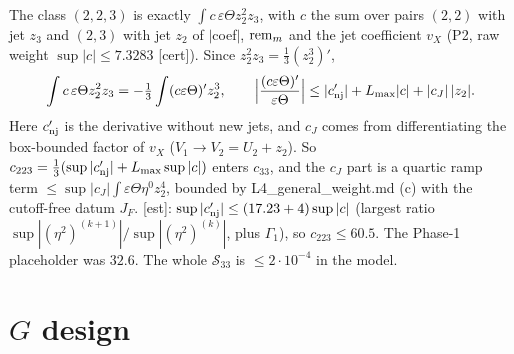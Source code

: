 \documentclass[11pt]{article}
\theoremstyle{remark}\newtheorem{remark}[theorem]{Remark}
\newcommand{\tC}{\textup{[cert]}}\newcommand{\tE}{\textup{[est]}}\newcommand{\tP}{\textup{[paper]}}\newcommand{\tR}{\textup{[rev]}}
\begin{document}
\begin{lemma}\label{lem:C}
The class $(2,2,3)$ is exactly $\int c\,\varepsilon\Theta z_2^2z_3$, with $c$ the sum over pairs $(2,2)$ with jet $z_3$ and $(2,3)$ with jet $z_2$ of $|$coef$|$, ${\rm rem}_m$ and the jet coefficient $v_X$ (P2, raw weight $\sup|c|\le7.3283$ \tC). Since $z_2^2z_3=\frac13(z_2^3)'$,
\[
\int c\,\varepsilon\Theta z_2^2z_3=-\tfrac13\int(c\varepsilon\Theta)'z_2^3,\qquad\Bigl|\frac{(c\varepsilon\Theta)'}{\varepsilon\Theta}\Bigr|\le|c'_{\rm nj}|+L_{\max}|c|+|c_J|\,|z_2| .
\]
Here $c'_{\rm nj}$ is the derivative without new jets, and $c_J$ comes from differentiating the box-bounded factor of $v_X$ ($V_1\to V_2=U_2+z_2$). So $c_{223}=\frac13(\sup|c'_{\rm nj}|+L_{\max}\sup|c|)$ enters $c_{33}$, and the $c_J$ part is a quartic ramp term $\le\sup|c_J|\int\varepsilon\Theta\eta^0z_2^4$, bounded by L4\_general\_weight.md (c) with the cutoff-free datum $J_F$. \tE: $\sup|c'_{\rm nj}|\le(17.23+4)\sup|c|$ (largest ratio $\sup|(\eta^2)^{(k+1)}|/\sup|(\eta^2)^{(k)}|$, plus $\Gamma_1$), so $c_{223}\le60.5$. The Phase-1 placeholder was $32.6$. The whole $\mathcal S_{33}$ is $\le2\cdot10^{-4}$ in the model.
\end{lemma}

\section{$\hat G$ design}\label{sec:G}
\end{document}

